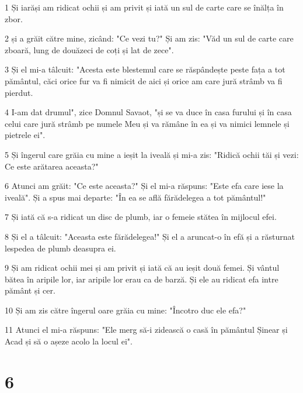 \par 1 Și iarăși am ridicat ochii și am privit și iată un sul de carte care se înălța în zbor.
\par 2 și a grăit către mine, zicând: "Ce vezi tu?" Și am zis: "Văd un sul de carte care zboară, lung de douăzeci de coți și lat de zece".
\par 3 Și el mi-a tâlcuit: "Acesta este blestemul care se răspândește peste fața a tot pământul, căci orice fur va fi nimicit de aici și orice am care jură strâmb va fi pierdut.
\par 4 I-am dat drumul", zice Domnul Savaot, "și se va duce în casa furului și în casa celui care jură strâmb pe numele Meu și va rămâne în ea și va nimici lemnele și pietrele ei".
\par 5 Și îngerul care grăia cu mine a ieșit la iveală și mi-a zis: "Ridică ochii tăi și vezi: Ce este arătarea aceasta?"
\par 6 Atunci am grăit: "Ce este aceasta?" Și el mi-a răspuns: "Este efa care iese la iveală". Și a spus mai departe: "În ea se află fărădelegea a tot pământul!"
\par 7 Și iată că s-a ridicat un disc de plumb, iar o femeie stătea în mijlocul efei.
\par 8 Și el a tâlcuit: "Aceasta este fărădelegea!" Și el a aruncat-o în efă și a răsturnat lespedea de plumb deasupra ei.
\par 9 Și am ridicat ochii mei și am privit și iată că au ieșit două femei. Și vântul bătea în aripile lor, iar aripile lor erau ca de barză. Și ele au ridicat efa intre pământ și cer.
\par 10 Și am zis către îngerul oare grăia cu mine: "Încotro duc ele efa?"
\par 11 Atunci el mi-a răspuns: "Ele merg să-i zidească o casă în pământul Șinear și Acad și să o așeze acolo la locul ei".

\chapter{6}

